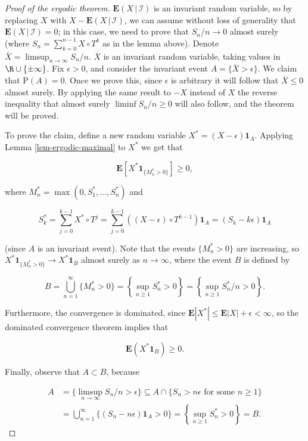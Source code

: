 \begin{proof}[Proof of the ergodic theorem]
$\mathbf{E}\left(X\,|\,\mathcal{I}\right)$ is an
invariant random variable, so by replacing $X$ with
$X-\mathbf{E}\left(X\,|\,\mathcal{I}\right)$, we can
assume without loss of generality that
$\mathbf{E}\left(X\,|\,\mathcal{I}\right)=0$; in this
case, we need to prove that $S_n/n\to 0$ almost
surely (where $S_n=\sum_{k=0}^{n-1} X\circ T^k$ as in
the lemma above). Denote
$\overline{X} = \limsup_{n\to\infty} S_n/n$.
$\overline{X}$ is an invariant random variable,
taking values in $\R\cup\{\pm\infty\}$. Fix
$\epsilon>0$, and consider the invariant event
$A= \{ \overline{X} > \epsilon \}$. We claim that
$\mathrm{P}(A)=0$. Once we prove this, since
$\epsilon$ is arbitrary it will follow that
$\overline{X}\le 0$ almost surely. By applying the
same result to $-X$ instead of $X$ the reverse
inequality that almost surely $\liminf S_n/n\ge 0$
will also follow, and the theorem will be proved.

To prove the claim, define a new random variable
$X^* = (X-\epsilon)\mathbf{1}_{A}$. Applying Lemma
\ref{lem-ergodic-maximal} to $X^*$ we get that

\[
\mathbf{E}\left[X^* \mathbf{1}_{\{ M_n^*>0\}}\right] \ge 0,
\]

\noindent where $M_n^* = \max(0,S_1^*,\ldots,S_n^*)$ and

\[
S_k^* = \sum_{j=0}^{k-1} X^*\circ T^j = \sum_{j=0}^{k-1} \left((X-\epsilon)\circ T^{k-1}\right) \mathbf{1}_A = (S_k-k\epsilon)\mathbf{1}_A
\]

\noindent (since $A$ is an invariant event). Note that the
events $\{M_n^* > 0\}$ are increasing, so
$X^* \mathbf{1}_{\{ M_n^*>0\}} \to X^* \mathbf{1}_B$
almost surely as $n\to\infty$, where the event $B$ is
defined by

\[
B=\bigcup_{n=1}^\infty \{M_n^* > 0 \} =
\left\{ \sup_{n\ge 1} S_n^* > 0 \right\}
= \left\{ \sup_{n\ge 1} S_n^*/n > 0 \right\}.
\]

\noindent Furthermore, the convergence is dominated, since
$\mathbf{E}|X^*| \le \mathbf{E}|X|+\epsilon<\infty$,
so the dominated convergence theorem implies that

\[
\mathbf{E}(X^* \mathbf{1}_B) \ge 0.
\]

\noindent Finally, observe that $A\subset B$, because

\begin{align*}
A&=\{\limsup_{n\to\infty} S_n/n>\epsilon\} \subseteq A \cap \{ S_n>n\epsilon \textrm{ for some }n\ge 1\} \\
&= \bigcup_{n=1}^\infty \{ (S_n-n\epsilon)\mathbf{1}_A > 0 \} = \left\{ \sup_{n\ge 1} S_n^*>0 \right\} = B.
\end{align*}


\end{proof}
